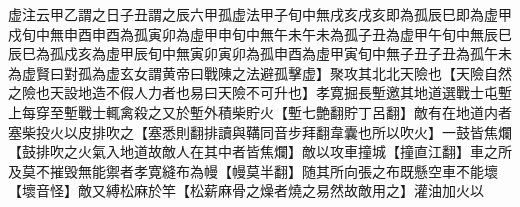 虚注云甲乙謂之日子丑謂之辰六甲孤虚法甲子旬中無戌亥戌亥即為孤辰巳即為虚甲戍旬中無申酉申酉為孤寅卯為虛甲申旬中無午未午未為孤子丑為虚甲午旬中無辰巳辰巳為孤戍亥為虛甲辰旬中無寅卯寅卯為孤申酉為虛甲寅旬中無子丑子丑為孤午未為虚賢曰對孤為虚玄女謂黄帝曰戰陳之法避孤擊虚】聚攻其北北天險也【天險自然之險也天設地造不假人力者也易曰天險不可升也】孝寛掘長塹邀其地道選戰士屯塹上每穿至塹戰士輒禽殺之又於塹外積柴貯火【塹七艶翻貯丁呂翻】敵有在地道内者塞柴投火以皮排吹之【塞悉則翻排讀與鞲同音步拜翻韋囊也所以吹火】一鼓皆焦爛【鼓排吹之火氣入地道故敵人在其中者皆焦爛】敵以攻車撞城【撞直江翻】車之所及莫不摧毁無能禦者孝寛縫布為幔【幔莫半翻】随其所向張之布既懸空車不能壞【壞音怪】敵又縛松麻於竿【松薪麻骨之燥者燒之易然故敵用之】灌油加火以